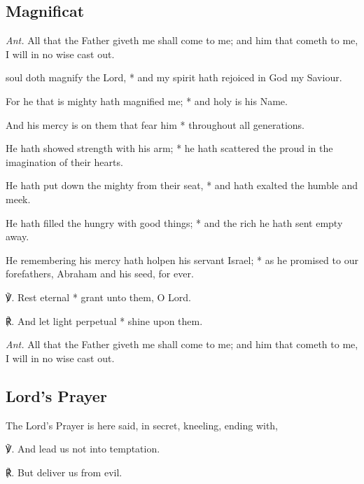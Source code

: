 \subsection{Magnificat}
\noindent
\textit{Ant.} All that the Father {\dag} giveth me shall come to me; and him that cometh to me, I will in no wise cast out.
\par
{} soul {} doth magnify the Lord, * and my spirit hath rejoiced in God my Saviour.\par
{}
    For he that is mighty hath magnified me; * and holy is his Name.\par
    And his mercy is on them that fear him * throughout all generations.\par
    He hath showed strength with his arm; * he hath scattered the proud in the imagination of their hearts.\par
    He hath put down the mighty from their seat, * and hath exalted the humble and meek.\par
    He hath filled the hungry with good things; * and the rich he hath sent empty away.\par
    He remembering his mercy hath holpen his servant Israel; * as he promised to our forefathers, Abraham and his seed, for ever.

℣. Rest eternal * grant unto them, O Lord.

℟. And let light perpetual * shine upon them.
\par\noindent
	\textit{Ant.} All that the Father giveth me shall come to me; and him that cometh to me, I will in no wise cast out.

\subsection{Lord's Prayer}
\begin{rubric}
    {The Lord's Prayer is here said, in secret, kneeling, ending with,}
\end{rubric}
℣. And lead us not into temptation.

℟. But deliver us from evil.


